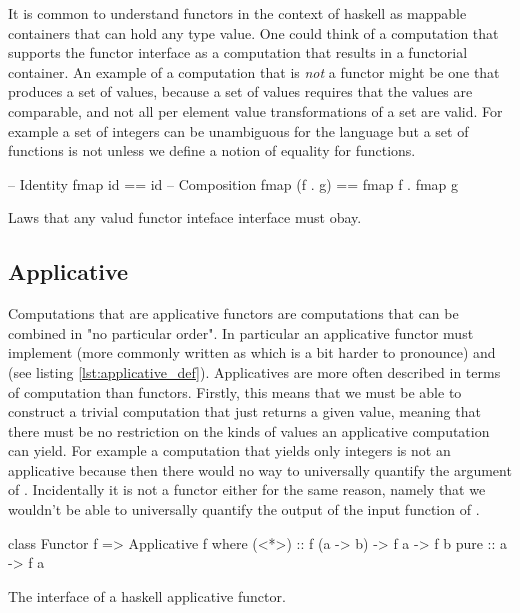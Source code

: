 It is common to understand functors in the context of haskell as
mappable containers that can hold any type value. One could think of a
computation that supports the functor interface as a computation that
results in a functorial container. An example of a computation that is
\emph{not} a functor might be one that produces a set of values,
because a set of values requires that the values are comparable, and
not all per element value transformations of a set are valid. For
example a set of integers  can be unambiguous for the
language but a set of functions  is not
unless we define a notion of equality for functions.

\begin{code}
\begin{haskellcode}
-- Identity
fmap id == id
-- Composition
fmap (f . g) == fmap f . fmap g
\end{haskellcode}
\caption{\label{lst:functor_laws}Laws that any valud functor inteface interface must obay.}
\end{code}


\subsection{Applicative}

Computations that are applicative
\cite{mcbrideApplicativeProgrammingEffects2008} functors are
computations that can be combined in "no particular order". In
particular an applicative functor must implement  (more commonly written as \hask{<*>} which is a
bit harder to pronounce) and  (see listing
\ref{lst:applicative_def}). Applicatives are more often described in
terms of computation than functors. Firstly, this means that we must
be able to construct a trivial computation that just returns a given
value, meaning that there must be no restriction on the kinds of
values an applicative computation can yield. For example a computation
that yields only integers is not an applicative because then there
would no way to universally quantify the argument of
. Incidentally it is not a functor either for the same
reason, namely that we wouldn't be able to universally quantify the
output of the input function of .

\begin{code}
\begin{haskellcode}
class Functor f => Applicative f  where
  (<*>) :: f (a -> b) -> f a -> f b
  pure :: a -> f a
\end{haskellcode}
\label{lst:applicative_def}
\caption{The interface of a haskell applicative functor.}
\end{code}

